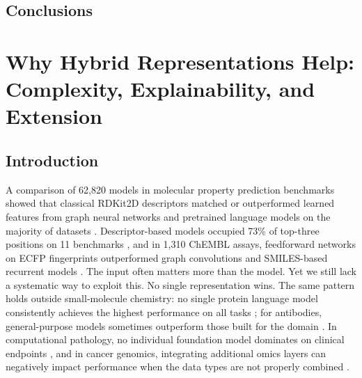 {%

\section{Conclusions}



\chapter{Why Hybrid Representations Help: Complexity, Explainability, and Extension}\label{chap:why}


\section{Introduction}

A comparison of 62,820 models in molecular property prediction benchmarks showed that classical RDKit2D descriptors matched or outperformed learned features from graph neural networks and pretrained language models on the majority of datasets \citep{Deng2023}. Descriptor-based models occupied 73\% of top-three positions on 11 benchmarks \citep{Jiang2021}, and in 1,310 ChEMBL assays, feedforward networks on ECFP fingerprints outperformed graph convolutions and SMILES-based recurrent models \citep{Mayr2018}. The input often matters more than the model. Yet we still lack a systematic way to exploit this. No single representation wins. The same pattern holds outside small-molecule chemistry: no single protein language model consistently achieves the highest performance on all tasks \citep{Kenlay2024, Schmirler2024}; for antibodies, general-purpose models sometimes outperform those built for the domain \citep{Kenlay2024}. In computational pathology, no individual foundation model dominates on clinical endpoints \citep{ElNahhas2025}, and in cancer genomics, integrating additional omics layers can negatively impact performance when the data types are not properly combined \citep{Steyaert2023}.

}
